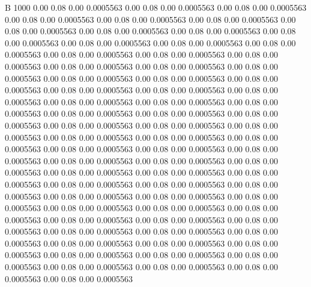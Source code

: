 


B 1000
   0.00    0.08    0.00   0.0005563
   0.00    0.08    0.00   0.0005563
   0.00    0.08    0.00   0.0005563
   0.00    0.08    0.00   0.0005563
   0.00    0.08    0.00   0.0005563
   0.00    0.08    0.00   0.0005563
   0.00    0.08    0.00   0.0005563
   0.00    0.08    0.00   0.0005563
   0.00    0.08    0.00   0.0005563
   0.00    0.08    0.00   0.0005563
   0.00    0.08    0.00   0.0005563
   0.00    0.08    0.00   0.0005563
   0.00    0.08    0.00   0.0005563
   0.00    0.08    0.00   0.0005563
   0.00    0.08    0.00   0.0005563
   0.00    0.08    0.00   0.0005563
   0.00    0.08    0.00   0.0005563
   0.00    0.08    0.00   0.0005563
   0.00    0.08    0.00   0.0005563
   0.00    0.08    0.00   0.0005563
   0.00    0.08    0.00   0.0005563
   0.00    0.08    0.00   0.0005563
   0.00    0.08    0.00   0.0005563
   0.00    0.08    0.00   0.0005563
   0.00    0.08    0.00   0.0005563
   0.00    0.08    0.00   0.0005563
   0.00    0.08    0.00   0.0005563
   0.00    0.08    0.00   0.0005563
   0.00    0.08    0.00   0.0005563
   0.00    0.08    0.00   0.0005563
   0.00    0.08    0.00   0.0005563
   0.00    0.08    0.00   0.0005563
   0.00    0.08    0.00   0.0005563
   0.00    0.08    0.00   0.0005563
   0.00    0.08    0.00   0.0005563
   0.00    0.08    0.00   0.0005563
   0.00    0.08    0.00   0.0005563
   0.00    0.08    0.00   0.0005563
   0.00    0.08    0.00   0.0005563
   0.00    0.08    0.00   0.0005563
   0.00    0.08    0.00   0.0005563
   0.00    0.08    0.00   0.0005563
   0.00    0.08    0.00   0.0005563
   0.00    0.08    0.00   0.0005563
   0.00    0.08    0.00   0.0005563
   0.00    0.08    0.00   0.0005563
   0.00    0.08    0.00   0.0005563
   0.00    0.08    0.00   0.0005563
   0.00    0.08    0.00   0.0005563
   0.00    0.08    0.00   0.0005563
   0.00    0.08    0.00   0.0005563
   0.00    0.08    0.00   0.0005563
   0.00    0.08    0.00   0.0005563
   0.00    0.08    0.00   0.0005563
   0.00    0.08    0.00   0.0005563
   0.00    0.08    0.00   0.0005563
   0.00    0.08    0.00   0.0005563
   0.00    0.08    0.00   0.0005563
   0.00    0.08    0.00   0.0005563
   0.00    0.08    0.00   0.0005563
   0.00    0.08    0.00   0.0005563
   0.00    0.08    0.00   0.0005563
   0.00    0.08    0.00   0.0005563
   0.00    0.08    0.00   0.0005563
   0.00    0.08    0.00   0.0005563
   0.00    0.08    0.00   0.0005563
   0.00    0.08    0.00   0.0005563
   0.00    0.08    0.00   0.0005563
   0.00    0.08    0.00   0.0005563
   0.00    0.08    0.00   0.0005563
   0.00    0.08    0.00   0.0005563
